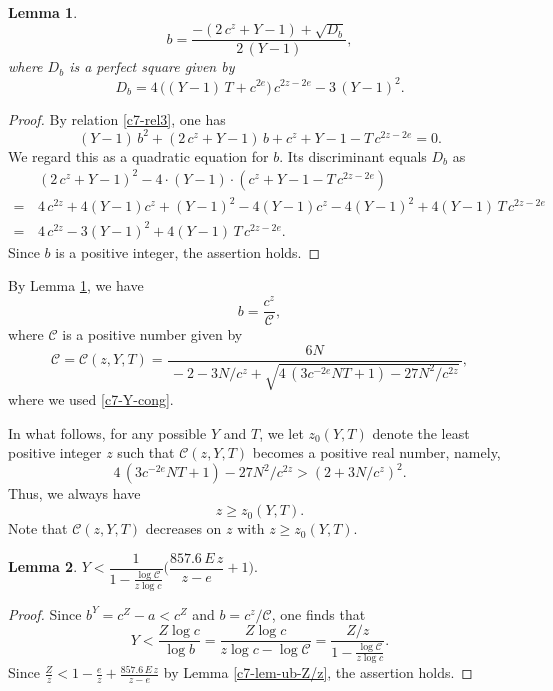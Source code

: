 \documentclass[11pt]{amsart}
\newtheorem{lem}{Lemma}[section]
\numberwithin{equation}{section}
\begin{document}
\begin{lem}\label{lem-c7-bformula}
\[
b=\frac{-(2\,c^z+Y-1)+\sqrt{D_b}}{2\,(Y-1)},
\]
where $D_b$ is a perfect square given by
\[
D_b=4\,\big((Y-1)\,T+c^{2e}\big)\,c^{2z-2e}-3\,(Y-1)^2.
\]
\end{lem}

\begin{proof}
By relation \eqref{c7-rel3}, one has
\[
(Y-1)\,b^2+(2\,c^z+Y-1)\,b+c^z+Y-1-T\,c^{2z-2e}=0.
\]
We regard this as a quadratic equation for $b$.
Its discriminant equals $D_b$ as
\begin{align*}
&\,(2\,c^z+Y-1)^2-4 \cdot (Y-1) \cdot (c^z+Y-1-T\,c^{2z-2e})\\
=&\,4\,c^{2z}+4 (Y-1) c^z + (Y-1)^2-4 (Y-1) c^z-4 (Y-1)^2+4(Y-1)\,T \,c^{2z-2e}\\
=&\,4\,c^{2z}-3 (Y-1)^2+4(Y-1)\,T\,c^{2z-2e}.
\end{align*}
Since $b$ is a positive integer, the assertion holds.
\end{proof}

By Lemma \ref{lem-c7-bformula}, we have
\[
b=\frac{c^z}{\mathcal C},
\]
where $\mathcal C$ is a positive number given by
\begin{equation}\label{def-calC}
\mathcal C=\mathcal C(z,Y,T)=\frac{6N}{\,-2-3N/c^z+\sqrt{4\,(3c^{-2e}N T+1)-27{N}^2/c^{2z}}\,},
\end{equation}
where we used \eqref{c7-Y-cong}.

In what follows, for any possible $Y$ and $T$, we let $z_0(Y,T)$ denote the least positive integer $z$ such that $\mathcal C(z,Y,T)$ becomes a positive real number, namely, 
\begin{equation}\label{ineq-z0def}
4\,(3c^{-2e}N T+1)-27N^2/c^{2z}>(2+3N/c^z)^2.
\end{equation}
Thus, we always have
\[
z \ge z_0(Y,T).
\]
Note that ${\mathcal C}(z,Y,T)$ decreases on $z$ with $z \ge z_0(Y,T)$.

\begin{lem}\label{lem-c7-ub-Y-sharp}
$Y<\dfrac{1}{1 - \frac{\log \mathcal C}{z\log c}} \biggl( \dfrac{857.6\,E\,z}{z-e}+1\bigg).$%
\end{lem}

\begin{proof}
Since $b^Y=c^Z-a<c^Z$ and $b=c^z/\mathcal C$, one finds that
\[
Y<\frac{Z \log c}{\log b}
=\frac{Z \log c}{z \log c - \log \mathcal C}
=\frac{Z/z}{1 - \frac{\log \mathcal C}{z\log c}}.
\]
Since $\frac{Z}{z} < 1 - \frac{e}{z} + \frac{857.6\,E\,z}{z-e}$ by Lemma \ref{c7-lem-ub-Z/z}, the assertion holds.
\end{proof}
\end{document}
